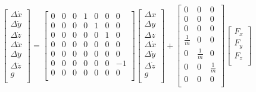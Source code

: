 \documentclass{article}
\begin{document}
\begin{equation}
	\begin{bmatrix}
	\Delta \dot{x}\\
	\Delta \dot{y}\\
	\Delta \dot{z}\\
	\Delta \ddot{x}\\
	\Delta \ddot{y}\\
	\Delta \ddot{z}\\
	g\\
	\end{bmatrix} = 
	\begin{bmatrix}
	0 & 0 & 0 & 1 & 0 & 0 & 0 \\
	0 & 0 & 0 & 0 & 1 & 0 & 0 \\
	0 & 0 & 0 & 0 & 0 & 1 & 0 \\
	0 & 0 & 0 & 0 & 0 & 0 & 0 \\
	0 & 0 & 0 & 0 & 0 & 0 & 0 \\
	0 & 0 & 0 & 0 & 0 & 0 & -1 \\
	0 & 0 & 0 & 0 & 0 & 0 & 0 \\
	\end{bmatrix}
	\begin{bmatrix}
	\Delta x\\
	\Delta y\\
	\Delta z\\
	\Delta \dot{x}\\
	\Delta \dot{y}\\
	\Delta \dot{z}\\
	g\\
	\end{bmatrix} + 
	\begin{bmatrix}
	0 & 0 & 0 \\
	0 & 0 & 0 \\
	0 & 0 & 0 \\
	\frac{1}{m} & 0 & 0 \\
	0 & \frac{1}{m} & 0 \\
	0 & 0 & \frac{1}{m} \\
	0 & 0 & 0 \\
	\end{bmatrix}
	\begin{bmatrix}
	F_x\\
	F_y\\
	F_z\\
	\end{bmatrix}
\end{equation}
\end{document}
